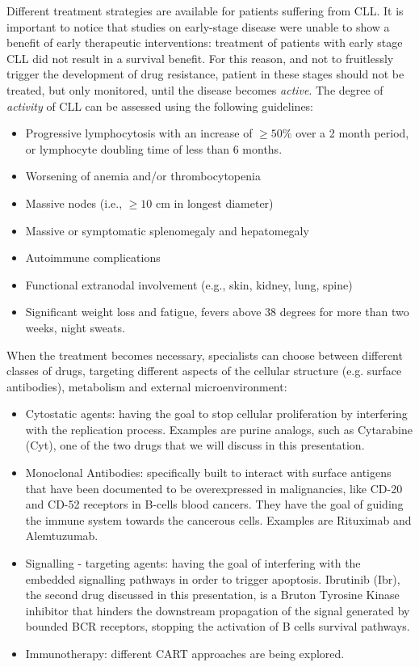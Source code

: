 \vspace{0.4cm}
Different treatment strategies are available for patients suffering from CLL. It is important to notice that studies on early-stage disease were unable to show a benefit of early therapeutic interventions: treatment of patients with early stage CLL did not result in a survival benefit. For this reason, and not to fruitlessly trigger the development of drug resistance, patient in these stages should not be treated, but only monitored, until the disease becomes \textit{active}. The degree of \textit{activity} of CLL can be assessed using the following guidelines:
\begin{itemize}
    \item Progressive lymphocytosis with an increase of $\geq 50 \%$ over a 2 month period, or lymphocyte doubling time of less than 6 months.
    \item Worsening of anemia and/or thrombocytopenia
    \item Massive nodes (i.e., $\geq 10$ cm in longest diameter)
    \item Massive or symptomatic splenomegaly and hepatomegaly
    \item Autoimmune complications
    \item Functional extranodal involvement (e.g., skin, kidney, lung, spine)
    \item Significant weight loss and fatigue, fevers above 38 degrees for more than two weeks, night sweats. 
\end{itemize}
When the treatment becomes necessary, specialists can choose between different classes of drugs, targeting different aspects of the cellular structure (e.g. surface antibodies), metabolism and external microenvironment:
\begin{itemize}
\item Cytostatic agents: having the goal to stop cellular proliferation by interfering with the replication process. Examples are purine analogs, such as Cytarabine (Cyt), one of the two drugs that we will discuss in this presentation.
\item Monoclonal Antibodies: specifically built to interact with surface antigens that have been documented to be overexpressed in malignancies, like CD-20 and CD-52 receptors in B-cells blood cancers. They have the goal of guiding the immune system towards the cancerous cells. Examples are Rituximab and Alemtuzumab.
\item Signalling - targeting agents: having the goal of interfering with the embedded signalling pathways in order to trigger apoptosis. Ibrutinib (Ibr), the second drug discussed in this presentation, is a Bruton Tyrosine Kinase inhibitor that hinders the downstream propagation of the signal generated by bounded BCR receptors, stopping the activation of B cells survival pathways. 
\item Immunotherapy: different CART approaches are being explored.
\end{itemize} \par

